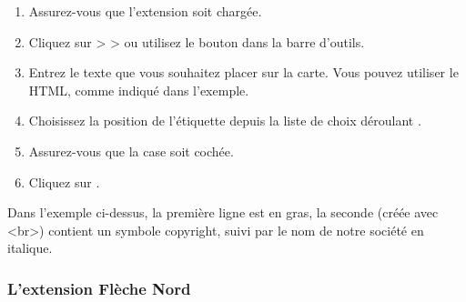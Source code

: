 \begin{enumerate}
\item Assurez-vous que l'extension soit charg\'ee.
\item Cliquez sur  >  >  ou utilisez le bouton  dans la barre d'outils.
\item Entrez le texte que vous souhaitez placer sur la carte. Vous pouvez utiliser le HTML, comme
  indiqu\'e dans l'exemple.
\item Choisissez la position de l'\'etiquette depuis la liste de choix d\'eroulant .
\item Assurez-vous que la case  soit coch\'ee.
\item Cliquez sur .
\end{enumerate}

Dans l'exemple ci-dessus, la premi\`ere ligne est en gras, la seconde (cr\'e\'ee avec
\textless br\textgreater) contient un symbole copyright, suivi par le nom de notre soci\'et\'e
en italique.

\subsubsection{L'extension Fl\`eche Nord}

